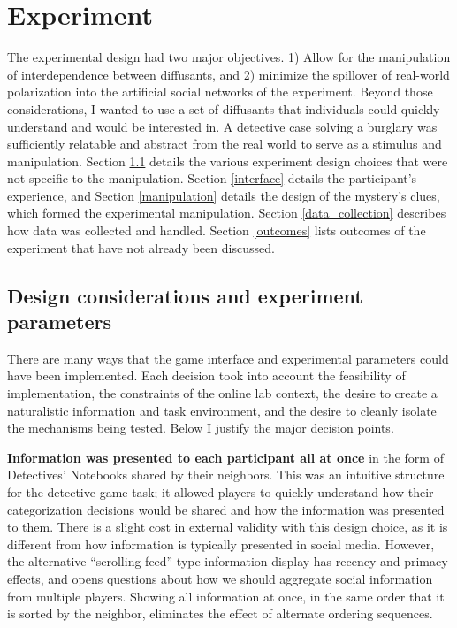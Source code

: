 \documentclass{article}
\begin{document}
\section{Experiment}
The experimental design had two major objectives. 1) Allow for the manipulation of interdependence between diffusants, and 2) minimize the spillover of real-world polarization into the artificial social networks of the experiment. Beyond those considerations, I wanted to use a set of diffusants that individuals could quickly understand and would be interested in. A detective case solving a burglary was sufficiently relatable and abstract from the real world to serve as a stimulus and manipulation. Section \ref{design_considerations} details the various experiment design choices that were not specific to the manipulation. Section \ref{interface} details the participant's experience, and Section \ref{manipulation} details the design of the mystery's clues, which formed the experimental manipulation. Section \ref{data_collection} describes how data was collected and handled. Section \ref{outcomes} lists outcomes of the experiment that have not already been discussed. 




\subsection{Design considerations and experiment parameters}
\label{design_considerations}
There are many ways that the game interface and experimental parameters could have been implemented. Each decision took into account the feasibility of implementation, the constraints of the online lab context, the desire to create a naturalistic information and task environment, and the desire to cleanly isolate the mechanisms being tested. Below I justify the major decision points.

\textbf{Information was presented to each participant all at once} in the form of Detectives' Notebooks shared by their neighbors. This was an intuitive structure for the detective-game task; it allowed players to quickly understand how their categorization decisions would be shared and how the information was presented to them. There is a slight cost in external validity with this design choice, as it is different from how information is typically presented in social media. However, the alternative ``scrolling feed'' type information display has recency and primacy effects, and opens questions about how we should aggregate social information from multiple players. Showing all information at once, in the same order that it is sorted by the neighbor, eliminates the effect of alternate ordering sequences.
\end{document}
